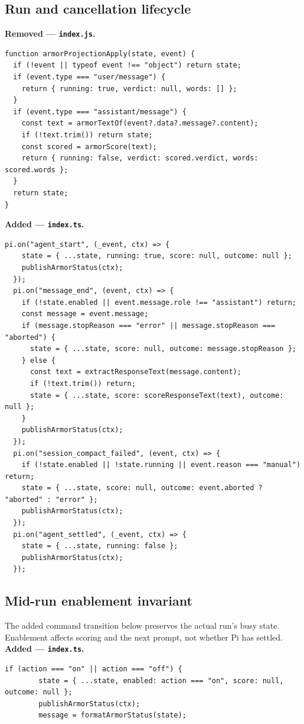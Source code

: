 \documentclass[10pt]{ltjsarticle}
\begin{document}
\subsection{Run and cancellation lifecycle}
\noindent\textbf{Removed --- \texttt{index.js}.}\par\smallskip
\begin{lstlisting}[backgroundcolor=\color{RemovedBg},firstnumber=110]
function armorProjectionApply(state, event) {
  if (!event || typeof event !== "object") return state;
  if (event.type === "user/message") {
    return { running: true, verdict: null, words: [] };
  }
  if (event.type === "assistant/message") {
    const text = armorTextOf(event?.data?.message?.content);
    if (!text.trim()) return state;
    const scored = armorScore(text);
    return { running: false, verdict: scored.verdict, words: scored.words };
  }
  return state;
}
\end{lstlisting}
\noindent\textbf{Added --- \texttt{index.ts}.}\par\smallskip
\begin{lstlisting}[backgroundcolor=\color{AddedBg},firstnumber=120]
  pi.on("agent_start", (_event, ctx) => {
    state = { ...state, running: true, score: null, outcome: null };
    publishArmorStatus(ctx);
  });
  pi.on("message_end", (event, ctx) => {
    if (!state.enabled || event.message.role !== "assistant") return;
    const message = event.message;
    if (message.stopReason === "error" || message.stopReason === "aborted") {
      state = { ...state, score: null, outcome: message.stopReason };
    } else {
      const text = extractResponseText(message.content);
      if (!text.trim()) return;
      state = { ...state, score: scoreResponseText(text), outcome: null };
    }
    publishArmorStatus(ctx);
  });
  pi.on("session_compact_failed", (event, ctx) => {
    if (!state.enabled || !state.running || event.reason === "manual") return;
    state = { ...state, score: null, outcome: event.aborted ? "aborted" : "error" };
    publishArmorStatus(ctx);
  });
  pi.on("agent_settled", (_event, ctx) => {
    state = { ...state, running: false };
    publishArmorStatus(ctx);
  });
\end{lstlisting}

\subsection{Mid-run enablement invariant}
The added command transition below preserves the actual run's busy state.
Enablement affects scoring and the next prompt, not whether Pi has settled.
\noindent\textbf{Added --- \texttt{index.ts}.}\par\smallskip
\begin{lstlisting}[backgroundcolor=\color{AddedBg}]
      if (action === "on" || action === "off") {
        state = { ...state, enabled: action === "on", score: null, outcome: null };
        publishArmorStatus(ctx);
        message = formatArmorStatus(state);
\end{lstlisting}
\end{document}
